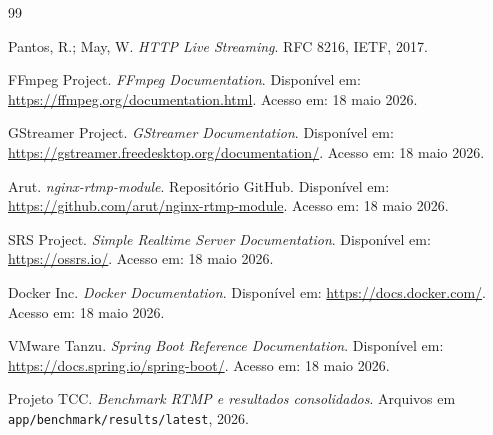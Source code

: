 \begin{thebibliography}{99}

Pantos, R.; May, W. \textit{HTTP Live Streaming}. RFC 8216, IETF, 2017.

FFmpeg Project. \textit{FFmpeg Documentation}. Disponível em: \url{https://ffmpeg.org/documentation.html}. Acesso em: 18 maio 2026.

GStreamer Project. \textit{GStreamer Documentation}. Disponível em: \url{https://gstreamer.freedesktop.org/documentation/}. Acesso em: 18 maio 2026.

Arut. \textit{nginx-rtmp-module}. Repositório GitHub. Disponível em: \url{https://github.com/arut/nginx-rtmp-module}. Acesso em: 18 maio 2026.

SRS Project. \textit{Simple Realtime Server Documentation}. Disponível em: \url{https://ossrs.io/}. Acesso em: 18 maio 2026.

Docker Inc. \textit{Docker Documentation}. Disponível em: \url{https://docs.docker.com/}. Acesso em: 18 maio 2026.

VMware Tanzu. \textit{Spring Boot Reference Documentation}. Disponível em: \url{https://docs.spring.io/spring-boot/}. Acesso em: 18 maio 2026.

Projeto TCC. \textit{Benchmark RTMP e resultados consolidados}. Arquivos em \texttt{app/benchmark/results/latest}, 2026.

\end{thebibliography}